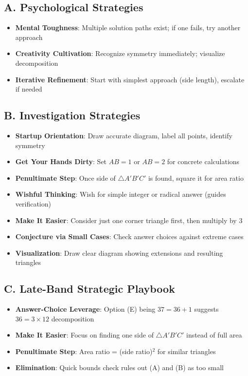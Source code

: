\documentclass[11pt]{article}
\begin{document}
\begin{strategicbox}
\subsection*{A. Psychological Strategies}
\begin{itemize}[leftmargin=*]
    \item \textbf{Mental Toughness}: Multiple solution paths exist; if one fails, try another approach
    \item \textbf{Creativity Cultivation}: Recognize symmetry immediately; visualize decomposition
    \item \textbf{Iterative Refinement}: Start with simplest approach (side length), escalate if needed
\end{itemize}

\subsection*{B. Investigation Strategies}
\begin{itemize}[leftmargin=*]
    \item \textbf{Startup Orientation}: Draw accurate diagram, label all points, identify symmetry
    \item \textbf{Get Your Hands Dirty}: Set $AB = 1$ or $AB = 2$ for concrete calculations
    \item \textbf{Penultimate Step}: Once side of $\triangle A'B'C'$ is found, square it for area ratio
    \item \textbf{Wishful Thinking}: Wish for simple integer or radical answer (guides verification)
    \item \textbf{Make It Easier}: Consider just one corner triangle first, then multiply by 3
    \item \textbf{Conjecture via Small Cases}: Check answer choices against extreme cases
    \item \textbf{Visualization}: Draw clear diagram showing extensions and resulting triangles
\end{itemize}

\subsection*{C. Late-Band Strategic Playbook}
\begin{itemize}[leftmargin=*]
    \item \textbf{Answer-Choice Leverage}: Option (E) being $37 = 36 + 1$ suggests $36 = 3 \times 12$ decomposition
    \item \textbf{Make It Easier}: Focus on finding one side of $\triangle A'B'C'$ instead of full area
    \item \textbf{Penultimate Step}: Area ratio = (side ratio)$^2$ for similar triangles
    \item \textbf{Elimination}: Quick bounds check rules out (A) and (B) as too small
\end{itemize}


\end{strategicbox}
\end{document}
